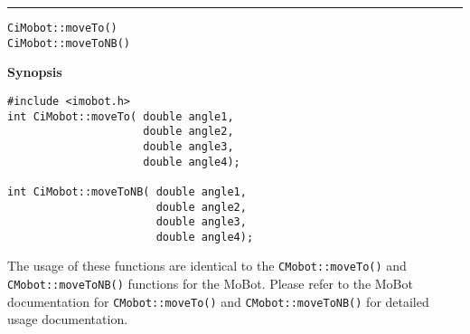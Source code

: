 \noindent
\vspace{5pt}
\rule{6.5in}{0.015in}
\noindent
{\LARGE \texttt{CiMobot::moveTo()}}\\
{\LARGE \texttt{CiMobot::moveToNB()}}\\
{}

\noindent
{\bf Synopsis}\\
\begin{verbatim}
#include <imobot.h>
int CiMobot::moveTo( double angle1, 
                     double angle2, 
                     double angle3, 
                     double angle4);

int CiMobot::moveToNB( double angle1, 
                       double angle2, 
                       double angle3, 
                       double angle4);
\end{verbatim}

The usage of these functions are identical to the
\texttt{CMobot::moveTo()} and \texttt{CMobot::moveToNB()} functions for the MoBot.
Please refer to the MoBot documentation for \texttt{CMobot::moveTo()} and
\texttt{CMobot::moveToNB()} for
detailed usage documentation.

